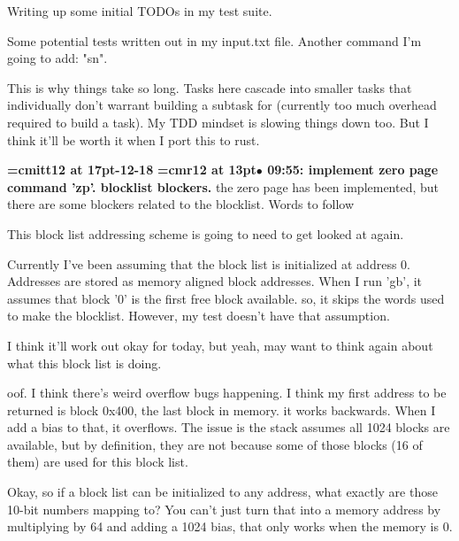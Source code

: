 Writing up some initial TODOs in my test suite.
\par

Some potential tests written out in my input.txt file. Another command I'm going to add: "sn".
\par

This is why things take so long. Tasks here cascade into smaller tasks that individually don't warrant building a subtask for (currently too much overhead required to build a task). My TDD mindset is slowing things down too. But I think it'll be worth it when I port this to rust.
\par

{\medskip\noindent\bf\font\titlefont=cmitt12 at 17pt-12-18}\medskip
{\smallskip\noindent\bf\font\titlefont=cmr12 at 13pt\titlefont $\bullet$ 09:55: implement zero page command 'zp'. blocklist blockers.}\smallskip
the zero page has been implemented, but there are some blockers related to the blocklist. Words to follow
\par

This block list addressing scheme is going to need to get looked at again.
\par

Currently I've been assuming that the block list is initialized at address 0. Addresses are stored as memory aligned block addresses. When I run 'gb', it assumes that block '0' is the first free block available. so, it skips the words used to make the blocklist. However, my test doesn't have that assumption.
\par

I think it'll work out okay for today, but yeah, may want to think again about what this block list is doing.
\par

oof. I think there's weird overflow bugs happening. I think my first address to be returned is block 0x400, the last block in memory. it works backwards. When I add a bias to that, it overflows. The issue is the stack assumes all 1024 blocks are available, but by definition, they are not because some of those blocks (16 of them) are used for this block list.
\par

Okay, so if a block list can be initialized to any address, what exactly are those 10-bit numbers mapping to? You can't just turn that into a memory address by multiplying by 64 and adding a 1024 bias, that only works when the memory is 0.
\par

